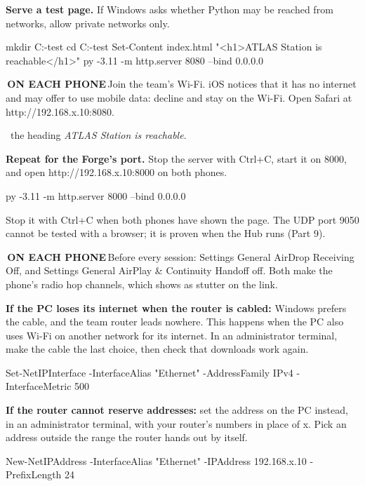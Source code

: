 \documentclass[10pt]{article}
\newcommand{\code}[1]{{\ttfamily\fontsize{8.8}{11}\selectfont #1}}
\newcommand{\tagchip}[2]{{\setlength{\fboxsep}{1.6pt}\colorbox{#1}{\fontsize{6.6}{8}\selectfont\bfseries\color{white}\,#2\,}}}
\newcommand{\onphone}{\tagchip{accC}{ON EACH PHONE}\enskip}
\newcommand{\see}{\par\vspace{0.6mm}{\footnotesize\color{mute}You should see:}}
\newcommand{\act}[1]{\textbf{#1}\enskip}
\newcommand{\step}{\needspace{21mm}\item}
\newenvironment{trap}[1][If it fails]{\par\vspace{1.4mm}\begin{lrbox}{\notebox}%
  \begin{minipage}{\dimexpr\linewidth-5mm\relax}\small\raggedright{\bfseries\color{accC}#1}\enskip}
  {\end{minipage}\end{lrbox}{\setlength{\fboxsep}{2.5mm}\colorbox{trapbg}{\usebox{\notebox}}}\par\vspace{1.4mm}}
\newcommand{\m}{\,\textrm{\guilsinglright}\,}
\begin{document}
\begin{steps}
\step \act{Serve a test page.} If Windows asks whether Python may be reached from networks, allow private networks only.
\begin{cmd}
mkdir C:\atlas-test
cd C:\atlas-test
Set-Content index.html "<h1>ATLAS Station is reachable</h1>"
py -3.11 -m http.server 8080 --bind 0.0.0.0
\end{cmd}

\step \onphone Join the team's Wi-Fi. iOS notices that it has no internet and may offer to use mobile data: decline and
      stay on the Wi-Fi. Open Safari at \code{http://192.168.x.10:8080}.
      \see\ the heading \emph{ATLAS Station is reachable}.

\step \act{Repeat for the Forge's port.} Stop the server with Ctrl+C, start it on 8000, and open
      \code{http://192.168.x.10:8000} on both phones.
\begin{cmd}
py -3.11 -m http.server 8000 --bind 0.0.0.0
\end{cmd}
      Stop it with Ctrl+C when both phones have shown the page. The UDP port 9050 cannot be tested with a browser; it is
      proven when the Hub runs (Part 9).

\step \onphone Before every session: Settings\m General\m AirDrop\m Receiving Off, and Settings\m General\m AirPlay \&
      Continuity\m Handoff off. Both make the phone's radio hop channels, which shows as stutter on the link.
\end{steps}
\begin{trap}[If the PC loses its internet when the router is cabled:]
Windows prefers the cable, and the team router leads nowhere. This happens when the PC also uses Wi-Fi on another network
for its internet. In an administrator terminal, make the cable the last choice, then check that downloads work again.
\begin{cmd}
Set-NetIPInterface -InterfaceAlias "Ethernet" -AddressFamily IPv4 -InterfaceMetric 500
\end{cmd}
\end{trap}
\begin{trap}[If the router cannot reserve addresses:]
set the address on the PC instead, in an administrator terminal, with your router's numbers in place of \code{x}.
Pick an address outside the range the router hands out by itself.
\begin{cmd}
New-NetIPAddress -InterfaceAlias "Ethernet" -IPAddress 192.168.x.10 -PrefixLength 24
\end{cmd}
\end{trap}
\end{document}
